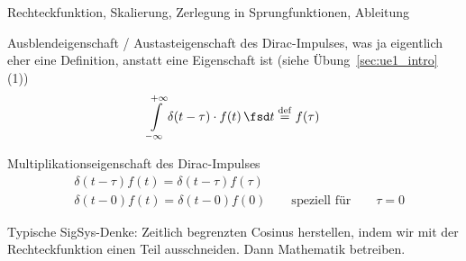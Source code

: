 \begin{Werkzeug}
Rechteckfunktion, Skalierung, Zerlegung in Sprungfunktionen, Ableitung

Ausblendeigenschaft / Austasteigenschaft des Dirac-Impulses,
was ja eigentlich eher eine Definition, anstatt eine Eigenschaft ist (siehe Übung~\ref{sec:ue1_intro} (1))
\begin{equation}
\int\limits_{-\infty}^{+\infty} \delta(t-\tau) \cdot f(t) \, \fsd t \stackrel{\mathrm{def}}= f(\tau)
\end{equation}

Multiplikationseigenschaft des Dirac-Impulses
\begin{align}
&\delta(t-\tau) f(t) = \delta(t-\tau) f(\tau)\\
&\delta(t - 0) f(t) = \delta(t - 0) f(0) \qquad \text{speziell für} \qquad \tau=0
\end{align}

\end{Werkzeug}
\begin{Ansatz}
Typische SigSys-Denke: Zeitlich begrenzten Cosinus herstellen, indem wir mit der
Rechteckfunktion einen Teil ausschneiden. Dann Mathematik betreiben.
\end{Ansatz}

